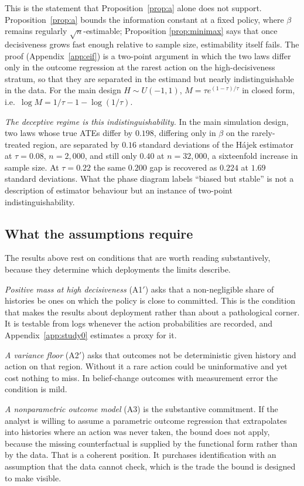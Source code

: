 \documentclass[11pt]{article}
\theoremstyle{definition}
\theoremstyle{remark}
\begin{document}
This is the statement that Proposition~\ref{prop:a} alone does not support.
Proposition~\ref{prop:a} bounds the information constant at a fixed policy,
where $\beta$ remains regularly $\sqrt{n}$-estimable; Proposition
\ref{prop:minimax} says that once decisiveness grows fast enough relative to
sample size, estimability itself fails. The proof (Appendix~\ref{app:eif})
is a two-point argument in which the two laws differ only in the outcome
regression at the rarest action on the high-decisiveness stratum, so that
they are separated in the estimand but nearly indistinguishable in the data.
For the main design $H \sim U(-1,1)$, $M = \tau e^{(1-\tau)/\tau}$ in closed
form, i.e.\ $\log M = 1/\tau - 1 - \log(1/\tau)$.

\emph{The deceptive regime is this indistinguishability.} In the main
simulation design, two laws whose true ATEs differ by $0.198$, differing
only in $\beta$ on the rarely-treated region, are separated by $0.16$
standard deviations of the H\'ajek estimator at $\tau = 0.08$, $n = 2{,}000$,
and still only $0.40$ at $n = 32{,}000$, a sixteenfold increase in sample
size. At $\tau = 0.22$ the same $0.200$ gap is recovered as $0.224$ at
$1.69$ standard deviations. What the phase diagram labels ``biased but
stable'' is not a description of estimator behaviour but an instance of
two-point indistinguishability.

\subsection{What the assumptions require}\label{sec:assumptions}

The results above rest on conditions that are worth reading substantively,
because they determine which deployments the limits describe.

\emph{Positive mass at high decisiveness} (A1$'$) asks that a
non-negligible share of histories be ones on which the policy is close to
committed. This is the condition that makes the results about deployment
rather than about a pathological corner. It is testable from logs whenever
the action probabilities are recorded, and Appendix~\ref{app:study0}
estimates a proxy for it.

\emph{A variance floor} (A2$'$) asks that outcomes not be deterministic
given history and action on that region. Without it a rare action could be
uninformative and yet cost nothing to miss. In belief-change outcomes with
measurement error the condition is mild.

\emph{A nonparametric outcome model} (A3) is the substantive commitment. If
the analyst is willing to assume a parametric outcome regression that
extrapolates into histories where an action was never taken, the bound does
not apply, because the missing counterfactual is supplied by the functional
form rather than by the data. That is a coherent position. It purchases
identification with an assumption that the data cannot check, which is the
trade the bound is designed to make visible.
\end{document}
